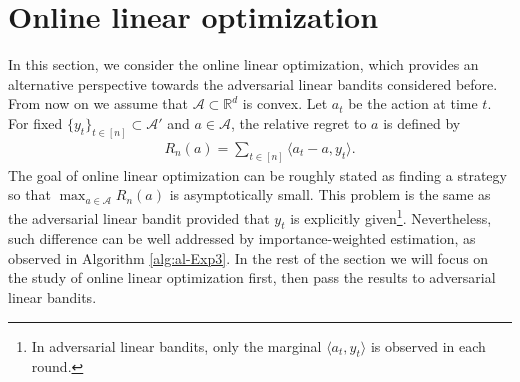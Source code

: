\documentclass[letterpaper,10pt,openright,openany]{book}
\numberwithin{equation}{section}
\theoremstyle{plain}
\theoremstyle{definition}
\def\R{{\mathbb R}}
\def\R{{\mathbb R}}
\begin{document}
\section{Online linear optimization}

In this section, we consider the online linear optimization, which provides an alternative perspective towards the adversarial linear bandits considered before. 
From now on we assume that $\mathcal A\subset\R^d$ is convex. 
Let $a_t$ be the action at time $t$. For fixed $\{y_t\}_{t\in [n]}\subset \mathcal A'$ and $a\in\mathcal A$, the relative regret to $a$ is defined by 
\begin{align*}
R_n(a) = \sum_{t\in [n]}\langle a_t-a, y_t\rangle. 
\end{align*}
The goal of online linear optimization can be roughly stated as finding a strategy so that $\max_{a\in\mathcal A}R_n(a)$ is asymptotically small. This problem is the same as the adversarial linear bandit provided that $y_t$ is explicitly given\footnote{In adversarial linear bandits, only the marginal $\langle a_t, y_t\rangle$ is observed in each round.}. 
Nevertheless, such difference can be well addressed by importance-weighted estimation, as observed in Algorithm \ref{alg:al-Exp3}. 
In the rest of the section we will focus on the study of online linear optimization first, then pass the results to adversarial linear bandits. 
\end{document}
